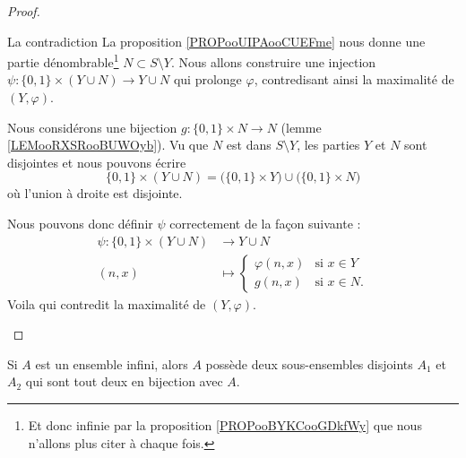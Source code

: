 \begin{proof}
\begin{subproof}
\begin{subproof}
                \item[La contradiction]
                    La proposition \ref{PROPooUIPAooCUEFme} nous donne une partie dénombrable\footnote{Et donc infinie par la proposition \ref{PROPooBYKCooGDkfWy} que nous n'allons plus citer à chaque fois.} \( N\subset S\setminus Y\). Nous allons construire une injection \( \psi\colon \{ 0,1 \}\times (Y\cup N)\to Y\cup N\) qui prolonge \( \varphi\), contredisant ainsi la maximalité de \( (Y,\varphi)\).

                    Nous considérons une bijection \( g\colon \{ 0,1 \}\times N\to N\) (lemme \ref{LEMooRXSRooBUWOyb}). Vu que \( N\) est dans \( S\setminus Y\), les parties \( Y\) et \( N\) sont disjointes et nous pouvons écrire
                    \begin{equation}
                        \{ 0,1 \}\times (Y\cup N)=\big( \{ 0,1 \}\times Y \big)\cup\big( \{ 0,1 \}\times N \big)
                    \end{equation}
                    où l'union à droite est disjointe.

                    Nous pouvons donc définir \( \psi\) correctement de la façon suivante :
                    \begin{equation}
                        \begin{aligned}
                            \psi\colon \{ 0,1 \}\times (Y\cup N)&\to Y\cup N \\
                            (n,x)&\mapsto \begin{cases}
                                \varphi(n,x)    &   \text{si } x\in Y\\
                                g(n,x)    &    \text{si }x\in N.
                            \end{cases}
                        \end{aligned}
                    \end{equation}
                    Voila qui contredit la maximalité de \( (Y,\varphi)\).
            \end{subproof}
    \end{subproof}
\end{proof}

\begin{corollary}       \label{CORooJCSIooOeOICJ}
    Si \( A\) est un ensemble infini, alors \( A\) possède deux sous-ensembles disjoints \( A_1\) et \( A_2\) qui sont tout deux en bijection avec \( A\).
\end{corollary}

